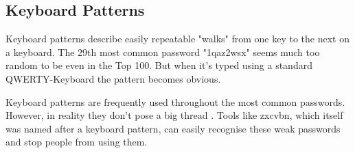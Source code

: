 \newpage

\subsection{Keyboard Patterns}

Keyboard patterns describe easily repeatable "walks" from one key to the next on a keyboard. The 29th most common password "1qaz2wsx" \cite{seclist} seems much too random to be even in the Top 100. But when it's typed using a standard QWERTY-Keyboard the pattern becomes obvious.

Keyboard patterns are frequently used throughout the most common passwords. However, in reality they don't pose a big thread \cite{unmasked}. Tools like zxcvbn, which itself was named after a keyboard pattern, can easily recognise these weak passwords and stop people from using them.

\newpage